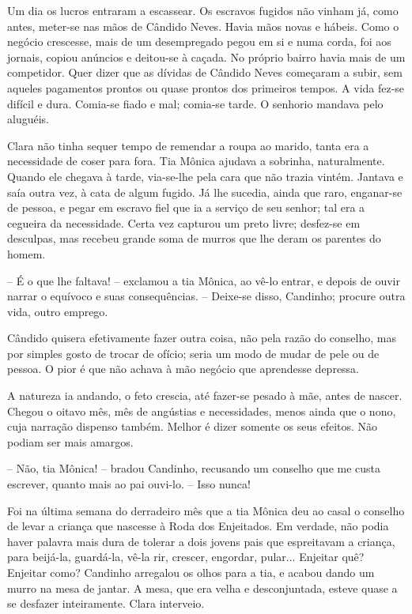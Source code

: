 Um dia os lucros entraram a escassear. Os escravos fugidos não vinham
já, como antes, meter-se nas mãos de Cândido Neves. Havia mãos novas e
hábeis. Como o negócio crescesse, mais de um desempregado pegou em si e
numa corda, foi aos jornais, copiou anúncios e deitou-se à caçada. No
próprio bairro havia mais de um competidor. Quer dizer que as dívidas de
Cândido Neves começaram a subir, sem aqueles pagamentos prontos ou quase
prontos dos primeiros tempos. A vida fez-se difícil e dura. Comia-se
fiado e mal; comia-se tarde. O senhorio mandava pelo aluguéis.

Clara não tinha sequer tempo de remendar a roupa ao marido, tanta era a
necessidade de coser para fora. Tia Mônica ajudava a sobrinha,
naturalmente. Quando ele chegava à tarde, via-se-lhe pela cara que não
trazia vintém. Jantava e saía outra vez, à cata de algum fugido. Já lhe
sucedia, ainda que raro, enganar-se de pessoa, e pegar em escravo fiel
que ia a serviço de seu senhor; tal era a cegueira da necessidade. Certa
vez capturou um preto livre; desfez-se em desculpas, mas recebeu grande
soma de murros que lhe deram os parentes do homem.

-- É o que lhe faltava! -- exclamou a tia Mônica, ao vê-lo entrar, e
depois de ouvir narrar o equívoco e suas consequências. -- Deixe-se
disso, Candinho; procure outra vida, outro emprego.

Cândido quisera efetivamente fazer outra coisa, não pela razão do
conselho, mas por simples gosto de trocar de ofício; seria um modo de
mudar de pele ou de pessoa. O pior é que não achava à mão negócio que
aprendesse depressa.

A natureza ia andando, o feto crescia, até fazer-se pesado à mãe, antes
de nascer. Chegou o oitavo mês, mês de angústias e necessidades, menos
ainda que o nono, cuja narração dispenso também. Melhor é dizer somente
os seus efeitos. Não podiam ser mais amargos.

-- Não, tia Mônica! -- bradou Candinho, recusando um conselho que me
custa escrever, quanto mais ao pai ouvi-lo. -- Isso nunca!

Foi na última semana do derradeiro mês que a tia Mônica deu ao casal o
conselho de levar a criança que nascesse à Roda dos Enjeitados. Em
verdade, não podia haver palavra mais dura de tolerar a dois jovens pais
que espreitavam a criança, para beijá-la, guardá-la, vê-la rir, crescer,
engordar, pular... Enjeitar quê? Enjeitar como? Candinho arregalou os
olhos para a tia, e acabou dando um murro na mesa de jantar. A mesa, que
era velha e desconjuntada, esteve quase a se desfazer inteiramente.
Clara interveio.

